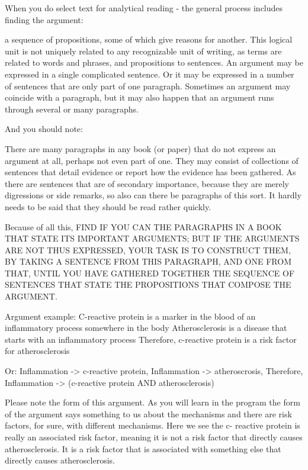 When you do select text for analytical reading - the general process includes finding the argument:
\begin{displayquote}
a sequence of propositions, some of which give reasons for another. This logical unit is not uniquely related to any recognizable unit of writing, as terms are related to words and phrases, and propositions to sentences. An argument may be expressed in a single complicated sentence. Or it may be expressed in a number of sentences that are only part of one paragraph. Sometimes an argument may coincide with a paragraph, but it may also happen that an argument runs through several or many paragraphs.
\end{displayquote}

And you should note: 
\begin{displayquote}
There are many paragraphs in any book (or paper) that do not express an argument at all, perhaps not even part of one. They may consist of collections of sentences that detail evidence or report how the evidence has been gathered. As there are sentences that are of secondary importance, because they are merely digressions or side remarks, so also can there be paragraphs of this sort. It hardly needs to be said that they should be read rather quickly. 

Because of all this, FIND IF YOU CAN THE PARAGRAPHS IN A BOOK THAT STATE ITS IMPORTANT ARGUMENTS; BUT IF THE ARGUMENTS ARE NOT THUS EXPRESSED, YOUR TASK IS TO CONSTRUCT THEM, BY TAKING A SENTENCE FROM THIS PARAGRAPH, AND ONE FROM THAT, UNTIL YOU HAVE GATHERED TOGETHER THE SEQUENCE OF SENTENCES THAT STATE THE PROPOSITIONS THAT COMPOSE THE ARGUMENT.
\end{displayquote}

Argument example:
C-reactive protein is a marker in the blood of an inflammatory process somewhere in the body
Atherosclerosis is a disease that starts with an inflammatory process
Therefore, c-reactive protein is a risk factor for atherosclerosis

Or:
Inflammation -> c-reactive protein,
Inflammation -> atheroscrosis,
Therefore, Inflammation -> (c-reactive protein AND atherosclerosis)

Please note the form of this argument. As you will learn in the program the form of the argument says something to us about the mechanisms and there are risk factors, for sure, with different mechanisms. Here we see the c- reactive protein is really an associated risk factor, meaning it is not a risk factor that directly causes atherosclerosis. It is a risk factor that is associated with something else that directly causes atherosclerosis.

